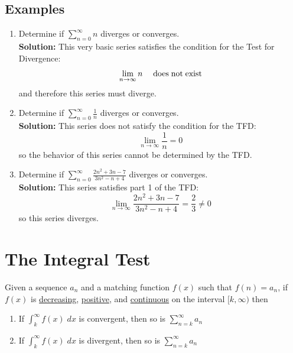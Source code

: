 \documentclass[12pt]{report}
\begin{document}
\subsection*{Examples}
\begin{enumerate}

    \item Determine if $ \sum_{n=0}^{\infty} n $ diverges or converges. \\
    
    \textbf{Solution:} This very basic series satisfies the condition for the Test for Divergence:
        $$\lim_{n\to\infty} n \quad \text{\;does\;not\;exist}$$
    and therefore this series must diverge.




    \item Determine if $ \sum_{n=0}^{\infty} \frac{1}{n} $ diverges or converges. \\ 
    
    \textbf{Solution:} This series does not satisfy the condition for the TFD:
        $$\lim_{n\to\infty} \frac{1}{n} = 0$$
    so the behavior of this series cannot be determined by the TFD.
    
    
    
    \item Determine if $ \sum_{n=0}^{\infty} \frac{2n^2 + 3n - 7}{3n^2 - n + 4} $ diverges or converges. \\
    
    \textbf{Solution:} This series satisfies part 1 of the TFD:
    	$$ \lim_{n\to\infty} \frac{2n^2 + 3n - 7}{3n^2 - n + 4} = \frac{2}{3} \neq 0 $$
    so this series diverges. 
\end{enumerate}




\clearpage





\section{The Integral Test}
Given a sequence $ a_n $ and a matching function $ f(x) $ such that $ f(n) = a_n $, if $ f(x) $ is \underline{decreasing}, \underline{positive}, and \underline{continuous} on the interval $ [k,\infty) $ then

\begin{enumerate}
	\item If $ \int_k^\infty f(x)\;dx $ is convergent, then so is $ \sum_{n=k}^{\infty} a_n $
	\item If $ \int_k^\infty f(x)\;dx $ is divergent, then so is $ \sum_{n=k}^{\infty} a_n $
\end{enumerate}
\end{document}
